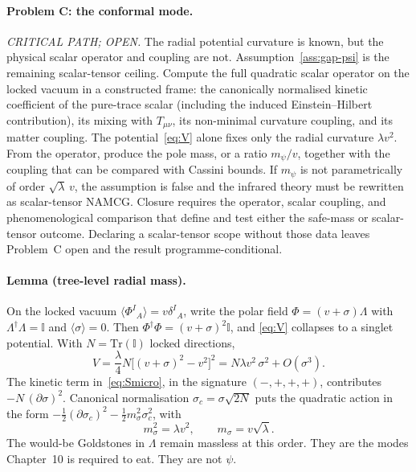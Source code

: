 \paragraph{Problem C: the conformal mode.}
\emph{CRITICAL PATH; OPEN.} The radial potential curvature is
known, but the physical scalar operator and coupling are not.
Assumption~\ref{ass:gap-psi} is the remaining scalar-tensor
ceiling. Compute the full quadratic scalar operator on the locked
vacuum in a constructed frame: the canonically normalised kinetic
coefficient of the pure-trace scalar (including the induced
Einstein--Hilbert contribution), its mixing with \(T_{\mu\nu}\), its
non-minimal curvature coupling, and its matter coupling. The
potential~\eqref{eq:V} alone fixes only the radial curvature
\(\lambda v^{2}\). From the operator, produce the pole mass, or a
ratio \(m_\psi/v\), together with the coupling that can be compared
with Cassini bounds. If \(m_\psi\) is not parametrically of order
\(\sqrt{\lambda}\,v\), the assumption is false and the infrared
theory must be rewritten as scalar-tensor NAMCG.
Closure requires the operator, scalar coupling, and phenomenological
comparison that define and test either the safe-mass or scalar-tensor
outcome. Declaring a scalar-tensor scope without those data leaves
Problem~C open and the result programme-conditional.

\paragraph{Lemma (tree-level radial mass).}
\label{lem:msigma}
On the locked vacuum \(\langle\Phi^{I}{}_{A}\rangle=v\delta^{I}{}_{A}\),
write the polar field
\(\Phi=(v+\sigma)\Lambda\) with \(\Lambda^{\dagger}\Lambda=\mathbb{I}\)
and \(\langle\sigma\rangle=0\).
Then \(\Phi^{\dagger}\Phi=(v+\sigma)^{2}\mathbb{I}\), and
\eqref{eq:V} collapses to a singlet potential.
With \(N=\mathrm{Tr}(\mathbb{I})\) locked directions,
\begin{equation}
  V
  =\frac{\lambda}{4}N\bigl[(v+\sigma)^{2}-v^{2}\bigr]^{2}
  =N\lambda v^{2}\,\sigma^{2}+O(\sigma^{3}).
\end{equation}
The kinetic term in~\eqref{eq:Smicro}, in the signature \((-,+,+,+)\),
contributes \(-N\,(\partial\sigma)^{2}\).
Canonical normalisation \(\sigma_{c}=\sigma\sqrt{2N}\)
puts the quadratic action in the form
\(-\tfrac12(\partial\sigma_{c})^{2}-\tfrac12 m_{\sigma}^{2}\sigma_{c}^{2}\),
with
\begin{equation}
  \label{eq:msigma}
  m_{\sigma}^{2}=\lambda v^{2},
  \qquad
  m_{\sigma}=v\sqrt{\lambda}.
\end{equation}
The would-be Goldstones in \(\Lambda\) remain massless at this order.
They are the modes Chapter~10 is required to eat.
They are not \(\psi\).

